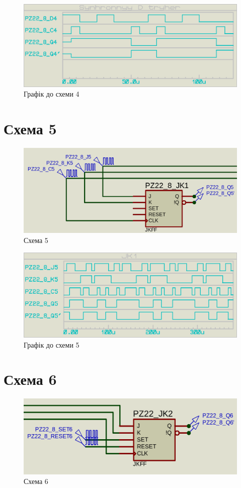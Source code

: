 \documentclass{article}
\begin{document}
\begin{normalsize}
	\begin{figure}[H]
		\centering
		\includegraphics[scale=0.25]{g4}	
		\caption{Графік до схеми 4}
	\end{figure}

	\section*{Схема 5}	
	\begin{figure}[H]
		\centering
		\includegraphics[scale=0.25]{s5}	
		\caption{Схема 5}
	\end{figure}
	
	\begin{figure}[H]
		\centering
		\includegraphics[scale=0.25]{g5}	
		\caption{Графік до схеми 5}
	\end{figure}

	\section*{Схема 6}	
	\begin{figure}[H]
		\centering
		\includegraphics[scale=0.25]{s6}	
		\caption{Схема 6}
	\end{figure}
	

\end{normalsize}
\end{document}
